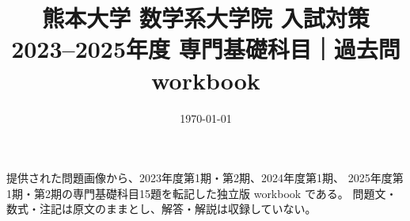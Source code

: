 \documentclass[uplatex, dvipdfmx, oneside]{jsreport}
\title{熊本大学 数学系大学院 入試対策\\{\Large 2023--2025年度 専門基礎科目｜過去問 workbook}}
\author{}
\date{\today}
\begin{document}
\maketitle

\begin{memo*}
提供された問題画像から、2023年度第1期・第2期、2024年度第1期、
2025年度第1期・第2期の専門基礎科目15題を転記した独立版 workbook である。
問題文・数式・注記は原文のままとし、解答・解説は収録していない。
\end{memo*}

\tableofcontents


\end{document}
